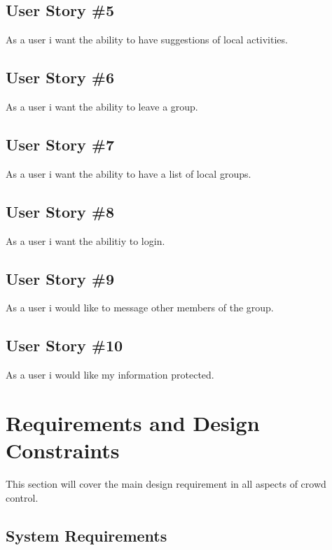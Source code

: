 \subsection{User Story \#5} 
As a user i want the ability to have suggestions of local activities.

\subsection{User Story \#6} 
As a user i want the ability to leave a group.

\subsection{User Story \#7} 
As a user i want the ability to have a list of local groups.

\subsection{User Story \#8} 
As a user i want the abilitiy to login.

\subsection{User Story \#9}
As a user i would like to message other members of the group.

\subsection{User Story \#10} 
As a user i would like my information protected. 




\section{Requirements and Design Constraints}

This section will cover the main design requirement in all aspects of crowd control.


\subsection{System  Requirements}

